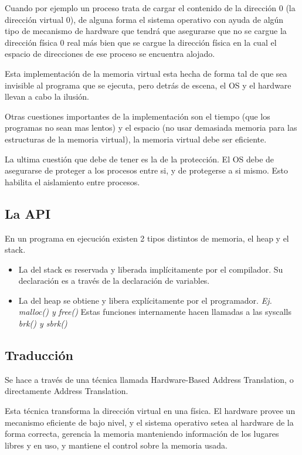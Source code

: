 \documentclass[titlepage,a4paper]{article}
\begin{document}
Cuando por ejemplo un proceso trata de cargar el contenido de la dirección 0 (la dirección virtual 0), de alguna forma el sistema operativo con ayuda de algún tipo de mecanismo de hardware que tendrá que asegurarse que no se cargue la dirección física 0 real más bien que se cargue la dirección física en la cual el espacio de direcciones de ese proceso se encuentra alojado.

Esta implementación de la memoria virtual esta hecha de forma tal de que sea invisible al programa que se ejecuta, pero detrás de escena, el OS y el hardware llevan a cabo la ilusión.

Otras cuestiones importantes de la implementación son el tiempo (que los programas no sean mas lentos) y el espacio (no usar demasiada memoria para las estructuras de la memoria virtual), la memoria virtual debe ser eficiente.

La ultima cuestión que debe de tener es la de la protección. El OS debe de asegurarse de proteger a los procesos entre si, y de protegerse a si mismo. Esto habilita el aislamiento entre procesos.

\subsection*{La API}
En un programa en ejecución existen 2 tipos distintos de memoria, el heap y el stack.
\begin{itemize}
\item La del stack es reservada y liberada implícitamente por el compilador. Su declaración es a través de la declaración de variables.
\item La del heap se obtiene y libera explícitamente por el programador. \textit{Ej. malloc() y free()} Estas funciones internamente hacen llamadas a las syscalls \textit{brk() y sbrk()}
\end{itemize}

\subsection*{Traducción}
Se hace a través de una técnica llamada Hardware-Based Address Translation, o directamente Address Translation. 

Esta técnica transforma la dirección virtual en una física. El hardware provee un mecanismo eficiente de bajo nivel, y el sistema operativo setea al hardware de la forma correcta, gerencia la memoria manteniendo información de los lugares libres y en uso, y mantiene el control sobre la memoria usada.
\end{document}
